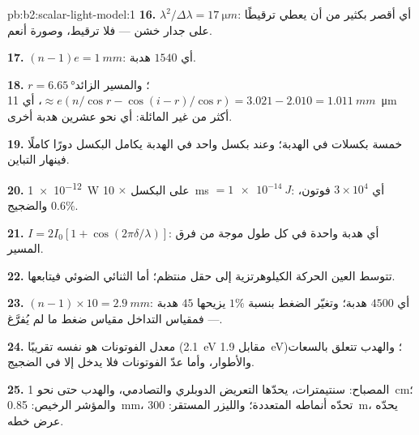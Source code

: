 \begin{solution}{pb:b2:scalar-light-model:1}
\textbf{16.} $\lambda^2/\Delta\lambda = \qty{17}{\micro m}$: أي أقصر بكثير من أن يعطي ترقيطًا على
جدار خشن --- فلا ترقيط، وصورة أنعم.

\textbf{17.} $(n - 1)e = \qty{1}{mm}$: أي $1540$ هدبة.

\textbf{18.} $r = \qty{6.65}{\degree}$؛ والمسير الزائد $\approx e(n/\cos r - \cos(i - r)/\cos r)
= 3.021 - 2.010 = \qty{1.011}{mm}$، أي \qty{11}{\micro m} أكثر من غير المائلة: أي نحو
عشرين هدبة أخرى.

\textbf{19.} خمسة بكسلات في الهدبة؛ وعند بكسل واحد في الهدبة يكامل البكسل
دورًا كاملًا فينهار التباين.

\textbf{20.} \qty{1e-12}{W} على البكسل $\times$ \qty{10}{ms} $= \qty{1e-14}{J}$: أي $3 \times 10^4$
فوتون، والضجيج $0.6\%$.

\textbf{21.} $I = 2I_0[1 + \cos(2\pi\delta/\lambda)]$: أي هدبة واحدة في كل طول موجة من
فرق المسير.

\textbf{22.} تتوسط العين الحركة الكيلوهرتزية إلى حقل
منتظم؛ أما الثنائي الضوئي فيتابعها.

\textbf{23.} $(n - 1) \times 10 = \qty{2.9}{mm}$: أي $4500$ هدبة؛ وتغيّر الضغط بنسبة $1\%$
يزيحها $45$ هدبة --- فمقياس التداخل مقياس ضغط ما لم
يُفرَّغ.

\textbf{24.} معدل الفوتونات هو نفسه تقريبًا (\qty{2.1}{eV} مقابل \qty{1.9}{eV})؛
والهدب تتعلق بالسعات والأطوار، وأما عدّ الفوتونات فلا يدخل إلا في
الضجيج.

\textbf{25.} المصباح: سنتيمترات، يحدّها التعريض الدوبلري
والتصادمي، والهدب حتى نحو \qty{1}{cm}؛ والمؤشر الرخيص: \qty{0.85}{mm}،
تحدّه أنماطه المتعددة؛ والليزر المستقر: \qty{300}{m}، يحدّه
عرض خطه.
\end{solution}
